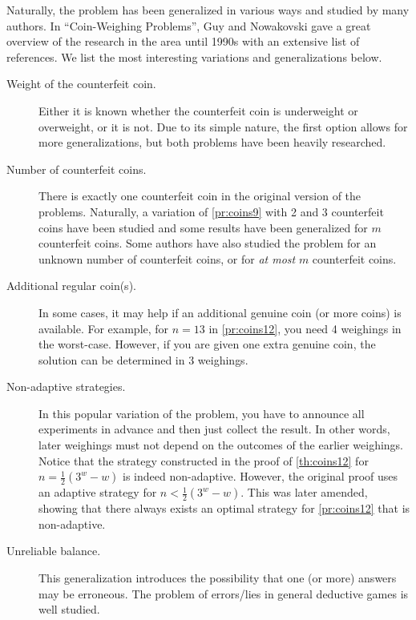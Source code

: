 Naturally, the problem has been generalized in various ways and
  studied by many authors.
In ``Coin-Weighing Problems''\cite{coins-cwproblems1995}, Guy and Nowakovski
  gave a great overview of the research in the area until 1990s
  with an extensive list of references.
We list the most interesting variations and generalizations below.

\begin{description}
\item[Weight of the counterfeit coin.]
  Either it is known whether the counterfeit coin is underweight or overweight,
  or it is not.
  Due to its simple nature, the first option allows for more generalizations,
  but both problems have been heavily researched.
\item[Number of counterfeit coins.]
  There is exactly one counterfeit coin in the original version of the problems.
  Naturally, a variation of \autoref{pr:coins9} with 2 and 3 counterfeit coins
   have been studied\cite{coins-2fakes}\cite{coins-3fakes} and some results
   have been generalized for $m$ counterfeit coins\cite{coins-mfakes}.
  Some authors have also studied the problem for an unknown number of
  counterfeit coins\cite{coins-unknownfakes},
  or for \emph{at most} $m$ counterfeit coins\cite{coins-atmostfakes}.
\item[Additional regular coin(s).]
  In some cases, it may help if an additional genuine coin (or more coins)
    is available.
  For example, for $n = 13$ in \autoref{pr:coins12}, you need 4 weighings in
  the worst-case.
  However, if you are given one extra genuine coin, the solution can be
    determined in 3 weighings\cite{coins-dyson1946}.
\item[Non-adaptive strategies.]
  In this popular variation of the problem, you have to announce all experiments
    in advance and then just collect the result.
  In other words, later weighings must not depend on the outcomes of the earlier weighings.
  Notice that the strategy constructed in the proof of \autoref{th:coins12} for
  $n = \frac{1}{2}(3^w - w)$ is indeed non-adaptive.
  However, the original proof uses an adaptive strategy for $n<\frac{1}{2}(3^w - w)$.
  This was later amended, showing that there always exists an optimal strategy for
  \autoref{pr:coins12} that is non-adaptive\cite{coins-nonadaptive}.
\item[Unreliable balance.]
  This generalization introduces the possibility that
  one (or more) answers may be erroneous.
  The problem of errors/lies in general deductive games is well studied\cite[see][]{games-lies}.

\end{description}
